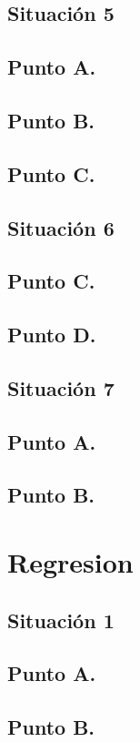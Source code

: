 \documentclass[letterpaper,12pt,onecolumn,titlepage]{article}
\begin{document}
\pagebreak\subsection{Situaci\'{o}n 5}
\subsection{Punto A.}
\subsection{Punto B.} 
\subsection{Punto C.}

\pagebreak\subsection{Situaci\'{o}n 6}
\subsection{Punto C.}
\subsection{Punto D.} 

\pagebreak\subsection{Situaci\'{o}n 7}
\subsection{Punto A.}
\subsection{Punto B.}

\pagebreak\section{Regresion}
\subsection{Situaci\'{o}n 1}
\subsection{Punto A.}
\subsection{Punto B.}
\end{document}
